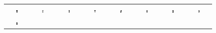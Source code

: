 \begin{figure}[ht]
	\centering
	\begin{tabular}{cccccccc}
		\includegraphics[width=0.1\textwidth]{images/eigenfaces/eigenface00} & \includegraphics[width=0.1\textwidth]{images/eigenfaces/eigenface01} &
		\includegraphics[width=0.1\textwidth]{images/eigenfaces/eigenface02} & \includegraphics[width=0.1\textwidth]{images/eigenfaces/eigenface03} &
		\includegraphics[width=0.1\textwidth]{images/eigenfaces/eigenface04} &
		\includegraphics[width=0.1\textwidth]{images/eigenfaces/eigenface05} & \includegraphics[width=0.1\textwidth]{images/eigenfaces/eigenface06} &
		\includegraphics[width=0.1\textwidth]{images/eigenfaces/eigenface07} \\ \includegraphics[width=0.1\textwidth]{images/eigenfaces/eigenface08} &

\end{tabular}
\end{figure}
